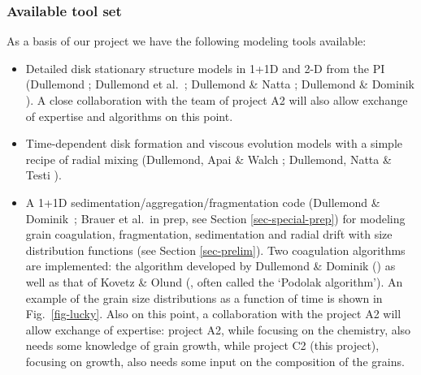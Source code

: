 \subsubsection{Available tool set}
As a basis of our project we have the following modeling tools available:
\begin{itemize}
\item Detailed disk stationary structure models in 1+1D and 2-D from 
the PI (Dullemond ; Dullemond et al.~; Dullemond
\& Natta ; Dullemond \& Dominik ). A close
collaboration with the team of project A2 will also allow exchange of
expertise and algorithms on this point.
\item Time-dependent disk formation and viscous evolution models with a simple
recipe of radial mixing (Dullemond, Apai \& Walch ; Dullemond,
Natta \& Testi ).
\item A 1+1D sedimentation/aggregation/fragmentation code (Dullemond \& 
Dominik~; Brauer et al.~in prep, see Section
\ref{sec-special-prep}) for modeling grain coagulation, fragmentation,
sedimentation and radial drift with size distribution functions (see Section
\ref{sec-prelim}). Two coagulation algorithms are implemented: 
the algorithm developed by Dullemond \& Dominik () as well as 
that of Kovetz \& Olund (, often called the `Podolak
algorithm'). An example of the grain size distributions as a function
of time is shown in Fig.~\ref{fig-lucky}. Also on this point, a
collaboration with the project A2 will allow exchange of expertise: project
A2, while focusing on the chemistry, also needs some knowledge of grain
growth, while project C2 (this project), focusing on growth, also needs some
input on the composition of the grains.
\end{itemize}

